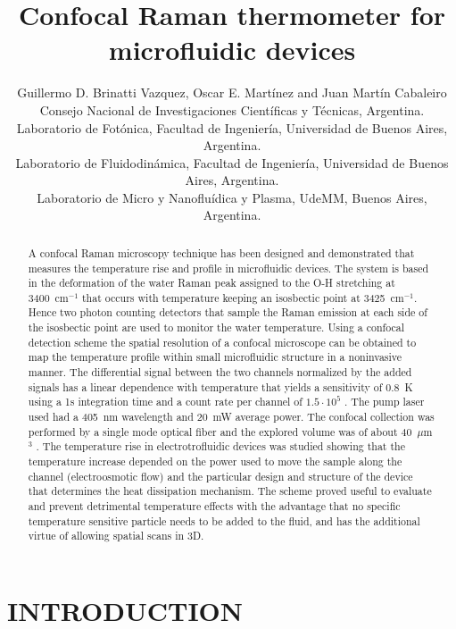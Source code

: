 \documentclass[]{spie}  %
\title{Confocal Raman thermometer for microfluidic devices}
\author{Guillermo D. Brinatti Vazquez\supit{a,b}, Oscar E. Martínez\supit{a,b} and Juan Martín Cabaleiro\supit{a,c,d}
\skiplinehalf
\supit{a}Consejo Nacional de Investigaciones Científicas y Técnicas, Argentina. \\
\supit{b}Laboratorio de Fotónica, Facultad de Ingeniería, Universidad de Buenos Aires, Argentina.\\
\supit{c}Laboratorio de Fluidodinámica, Facultad de Ingeniería, Universidad de Buenos Aires, Argentina.\\
\supit{d}Laboratorio de Micro y Nanofluídica y Plasma, UdeMM, Buenos Aires, Argentina.
}
\begin{document}
 
  \maketitle 

\begin{abstract}
A confocal Raman microscopy technique has been designed and demonstrated that measures the
temperature rise and profile in microfluidic devices. The system is based in the deformation of the water
Raman peak assigned to the O-H stretching at 3400~cm$^{-1}$ that occurs with temperature keeping an
isosbectic point at 3425~cm$^{-1}$. Hence two photon counting detectors that sample the Raman emission at
each side of the isosbectic point are used to monitor the water temperature. Using a confocal detection
scheme the spatial resolution of a confocal microscope can be obtained to map the temperature profile
within small microfluidic structure in a noninvasive manner. The differential signal between the two
channels normalized by the added signals has a linear dependence with temperature that yields a
sensitivity of 0.8~K using a 1s integration time and a count rate per channel of $1.5\cdot 10^5$ . The pump laser used had a 405~nm wavelength and 20~mW average power. The confocal collection was performed by a
single mode optical fiber and the explored volume was of about 40~$\mu$m$^3$ . The temperature rise in
electrotrofluidic devices was studied showing that the temperature increase depended on the power
used to move the sample along the channel (electroosmotic flow) and the particular design and
structure of the device that determines the heat dissipation mechanism. The scheme proved useful to
evaluate and prevent detrimental temperature effects with the advantage that no specific temperature
sensitive particle needs to be added to the fluid, and has the additional virtue of allowing spatial scans in
3D.
\end{abstract}



\section{INTRODUCTION}
\end{document}
